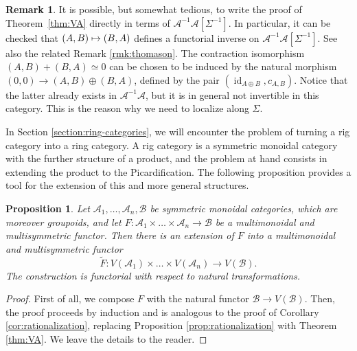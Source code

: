 \documentclass[11pt]{article}
\newcommand\mto{\mathchoice{\longmapsto}{\mapsto}{\mapsto}{\mapsto}}
\theoremstyle{plain}
\newtheorem{proposition}[theorem]{Proposition}
\theoremstyle{definition}
\newtheorem{remark}[theorem]{Remark}
\newcommand{\Acal}{\mathcal A}
\newcommand{\Bcal}{\mathcal B}
\DeclareMathOperator{\id}{id}
\begin{document}
\begin{remark}\label{rmk:thomason-strict}
It is possible, but somewhat tedious, to write the proof of Theorem~\ref{thm:VA} directly in terms of $\Acal^{-1}\Acal[\Sigma^{-1}]$. In particular, it can be checked that \hbox{$(A,B)\mto (B,A)$} defines a functorial inverse on $\Acal^{-1}\Acal[\Sigma^{-1}]$. See also the related Remark \ref{rmk:thomason}. The contraction isomorphism $(A,B)+(B,A)\simeq 0$ can be chosen to be induced by the natural morphism $(0,0)\to (A,B)\oplus (B,A)$, defined by the pair $(\id_{A\oplus B}, c_{A,B})$. Notice that the latter already exists in $\Acal^{-1}\Acal$, but it is in general not invertible in this category. This is the reason why we need to localize along $\Sigma$.

\end{remark}

In Section \ref{section:ring-categories}, we will encounter the problem of turning a rig category into a ring category. A rig category is a symmetric monoidal category with the further structure of a product, and the problem at hand consists in extending the product to the Picardification. The following proposition provides a tool for the extension of this and more general structures.

\begin{proposition}\label{prop:product}
Let $\Acal_{1},\ldots,\Acal_{n},\Bcal$ be symmetric monoidal categories, which are moreover groupoids, and let $F\colon \Acal_{1}\times\ldots\times\Acal_{n}\to\Bcal$ be a multimonoidal and multisymmetric functor. Then there is an extension of $F$ into a multimonoidal and multisymmetric functor
\begin{displaymath}
\widetilde{F}\colon V(\Acal_{1})\times\ldots \times V(\Acal_{n})\to V(\Bcal).
\end{displaymath}
The construction is functorial with respect to natural transformations.
\end{proposition}
\begin{proof}
First of all, we compose $F$ with the natural functor $\Bcal\to V(\Bcal)$. Then, the proof proceeds by induction and is analogous to the proof of Corollary \ref{cor:rationalization}, replacing Proposition \ref{prop:rationalization} with Theorem \ref{thm:VA}. We leave the details to the reader.
\end{proof}
\end{document}
